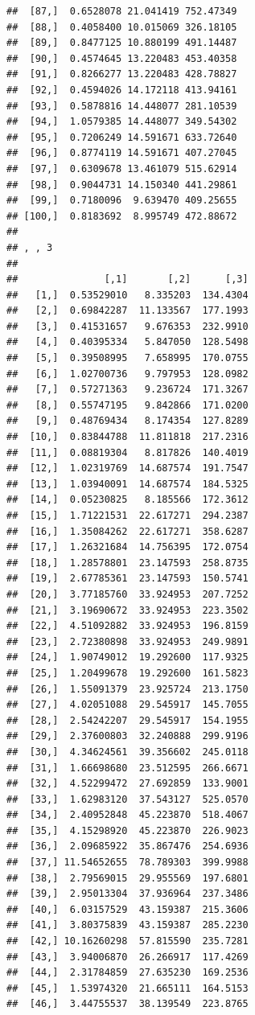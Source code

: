 \documentclass[article]{jss}\usepackage[]{graphicx}\usepackage[]{xcolor}
\makeatletter
\newenvironment{kframe}{%
 \def\at@end@of@kframe{}%
 \ifinner\ifhmode%
  \def\at@end@of@kframe{\end{minipage}}%
  \begin{minipage}{\columnwidth}%
 \fi\fi%
 \def\FrameCommand##1{\hskip\@totalleftmargin \hskip-\fboxsep
 \colorbox{shadecolor}{##1}\hskip-\fboxsep
     \hskip-\linewidth \hskip-\@totalleftmargin \hskip\columnwidth}%
 \MakeFramed {\advance\hsize-\width
   \@totalleftmargin\z@ \linewidth\hsize
   \@setminipage}}%
 {\par\unskip\endMakeFramed%
 \at@end@of@kframe}
\newenvironment{knitrout}{}{} %
\makeatother
\begin{document}
\begin{knitrout}
\begin{kframe}
\begin{verbatim}
##  [87,]  0.6528078 21.041419 752.47349
##  [88,]  0.4058400 10.015069 326.18105
##  [89,]  0.8477125 10.880199 491.14487
##  [90,]  0.4574645 13.220483 453.40358
##  [91,]  0.8266277 13.220483 428.78827
##  [92,]  0.4594026 14.172118 413.94161
##  [93,]  0.5878816 14.448077 281.10539
##  [94,]  1.0579385 14.448077 349.54302
##  [95,]  0.7206249 14.591671 633.72640
##  [96,]  0.8774119 14.591671 407.27045
##  [97,]  0.6309678 13.461079 515.62914
##  [98,]  0.9044731 14.150340 441.29861
##  [99,]  0.7180096  9.639470 409.25655
## [100,]  0.8183692  8.995749 472.88672
## 
## , , 3
## 
##               [,1]       [,2]      [,3]
##   [1,]  0.53529010   8.335203  134.4304
##   [2,]  0.69842287  11.133567  177.1993
##   [3,]  0.41531657   9.676353  232.9910
##   [4,]  0.40395334   5.847050  128.5498
##   [5,]  0.39508995   7.658995  170.0755
##   [6,]  1.02700736   9.797953  128.0982
##   [7,]  0.57271363   9.236724  171.3267
##   [8,]  0.55747195   9.842866  171.0200
##   [9,]  0.48769434   8.174354  127.8289
##  [10,]  0.83844788  11.811818  217.2316
##  [11,]  0.08819304   8.817826  140.4019
##  [12,]  1.02319769  14.687574  191.7547
##  [13,]  1.03940091  14.687574  184.5325
##  [14,]  0.05230825   8.185566  172.3612
##  [15,]  1.71221531  22.617271  294.2387
##  [16,]  1.35084262  22.617271  358.6287
##  [17,]  1.26321684  14.756395  172.0754
##  [18,]  1.28578801  23.147593  258.8735
##  [19,]  2.67785361  23.147593  150.5741
##  [20,]  3.77185760  33.924953  207.7252
##  [21,]  3.19690672  33.924953  223.3502
##  [22,]  4.51092882  33.924953  196.8159
##  [23,]  2.72380898  33.924953  249.9891
##  [24,]  1.90749012  19.292600  117.9325
##  [25,]  1.20499678  19.292600  161.5823
##  [26,]  1.55091379  23.925724  213.1750
##  [27,]  4.02051088  29.545917  145.7055
##  [28,]  2.54242207  29.545917  154.1955
##  [29,]  2.37600803  32.240888  299.9196
##  [30,]  4.34624561  39.356602  245.0118
##  [31,]  1.66698680  23.512595  266.6671
##  [32,]  4.52299472  27.692859  133.9001
##  [33,]  1.62983120  37.543127  525.0570
##  [34,]  2.40952848  45.223870  518.4067
##  [35,]  4.15298920  45.223870  226.9023
##  [36,]  2.09685922  35.867476  254.6936
##  [37,] 11.54652655  78.789303  399.9988
##  [38,]  2.79569015  29.955569  197.6801
##  [39,]  2.95013304  37.936964  237.3486
##  [40,]  6.03157529  43.159387  215.3606
##  [41,]  3.80375839  43.159387  285.2230
##  [42,] 10.16260298  57.815590  235.7281
##  [43,]  3.94006870  26.266917  117.4269
##  [44,]  2.31784859  27.635230  169.2536
##  [45,]  1.53974320  21.665111  164.5153
##  [46,]  3.44755537  38.139549  223.8765

\end{verbatim}
\end{kframe}
\end{knitrout}
\end{document}
